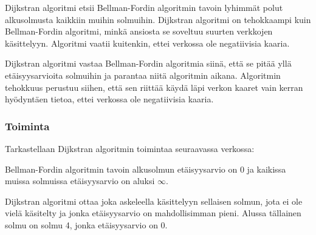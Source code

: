 Dijkstran algoritmi etsii Bellman-Fordin
algoritmin tavoin lyhimmät polut
alkusolmusta kaikkiin muihin solmuihin.
Dijkstran algoritmi on tehokkaampi kuin
Bellman-Fordin algoritmi,
minkä ansiosta se soveltuu suurten
verkkojen käsittelyyn.
Algoritmi vaatii kuitenkin,
ettei verkossa ole negatiivisia kaaria.

Dijkstran algoritmi vastaa
Bellman-Fordin algoritmia siinä,
että se pitää
yllä etäisyysarvioita solmuihin
ja parantaa niitä algoritmin aikana.
Algoritmin tehokkuus perustuu
siihen, että sen riittää käydä läpi
verkon kaaret vain kerran
hyödyntäen tietoa,
ettei verkossa ole negatiivisia kaaria.

\subsubsection{Toiminta}

Tarkastellaan Dijkstran algoritmin toimintaa
seuraavassa verkossa:
\begin{center}
\end{center}
Bellman-Fordin algoritmin tavoin
alkusolmun etäisyysarvio on 0
ja kaikissa muissa solmuissa etäisyysarvio
on aluksi $\infty$.

Dijkstran algoritmi
ottaa joka askeleella käsittelyyn
sellaisen solmun,
jota ei ole vielä käsitelty
ja jonka etäisyysarvio on
mahdollisimman pieni.
Alussa tällainen solmu on solmu 4,
jonka etäisyysarvio on 0.

